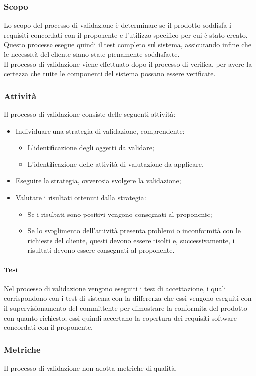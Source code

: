 \documentclass[../norme-di-progetto.tex]{subfiles}
\begin{document}
\subsubsection{Scopo}
Lo scopo del processo di validazione è determinare se il prodotto soddisfa i requisiti concordati con il proponente e l'utilizzo specifico per cui è stato creato. Questo processo esegue quindi il test completo sul sistema, assicurando infine che le necessità del cliente siano state pienamente soddisfatte. \\ Il processo di validazione viene effettuato dopo il processo di verifica, per avere la certezza che tutte le componenti del sistema possano essere verificate.
\subsubsection{Attività}
Il processo di validazione consiste delle seguenti attività:
\begin{itemize}
  \item Individuare una strategia di validazione, comprendente:
  \begin{itemize}
    \item L'identificazione degli oggetti da validare;
    \item L'identificazione delle attività di valutazione da applicare.
  \end{itemize}
  \item Eseguire la strategia, ovverosia svolgere la validazione;
  \item Valutare i risultati ottenuti dalla strategia:
  \begin{itemize}
    \item Se i risultati sono positivi vengono consegnati al proponente;
    \item Se lo svoglimento dell'attività presenta problemi o inconformità con le richieste del cliente, questi devono essere risolti e, successivamente, i risultati devono essere consegnati al proponente.
  \end{itemize}
\end{itemize}
\paragraph{Test}
Nel processo di validazione vengono eseguiti i test di accettazione, i quali corrispondono con i test di sistema con la differenza che essi vengono eseguiti con il supervisionamento del committente per dimostrare la conformità del prodotto con quanto richiesto; essi quindi accertano la copertura dei requisiti software concordati con il proponente.

\subsubsection{Metriche}
Il processo di validazione non adotta metriche di qualità.
\end{document}
